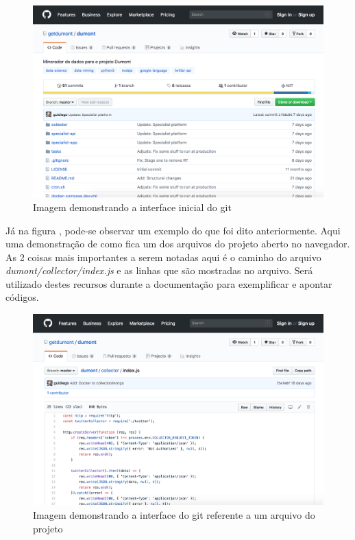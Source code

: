 \begin{figure}
    \centering
    \includegraphics[width=.8\textwidth]{imagens/git_init.png}
    \caption{Imagem demonstrando a interface inicial do git}
    \label{fig:git_init}
\end{figure}

Já na figura \label{fig:git_file}, pode-se observar um exemplo do que foi dito anteriormente. Aqui uma demonstração de como fica um dos arquivos do projeto aberto no navegador. As 2 coisas mais importantes a serem notadas aqui é o caminho do arquivo \textit{dumont/collector/index.js} e as linhas que são mostradas no arquivo. Será utilizado destes recursos durante a documentação para exemplificar e apontar códigos.

\begin{figure}
    \centering
    \includegraphics[width=.8\textwidth]{imagens/git_file.png}
    \caption{Imagem demonstrando a interface do git referente a um arquivo do projeto}
    \label{fig:git_file}
\end{figure}
